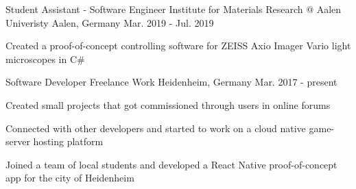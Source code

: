 \begin{cventries}
  \cventry
    {Student Assistant - Software Engineer} %
    {Institute for Materials Research @ Aalen Univeristy} %
    {Aalen, Germany} %
    {Mar. 2019 - Jul. 2019} %
    {
      \begin{cvitems} %
        \item {Created a proof-of-concept controlling software for ZEISS Axio Imager Vario light microscopes in C\#}
      \end{cvitems}
    }

  \cventry
    {Software Developer} %
    {Freelance Work} %
    {Heidenheim, Germany} %
    {Mar. 2017 - present} %
    {
      \begin{cvitems} %
        \item {Created small projects that got commissioned through users in online forums}
        \item {Connected with other developers and started to work on a cloud native game-server hosting platform}
        \item {Joined a team of local students and developed a React Native proof-of-concept app for the city of Heidenheim}
      \end{cvitems}
    }

\end{cventries}
